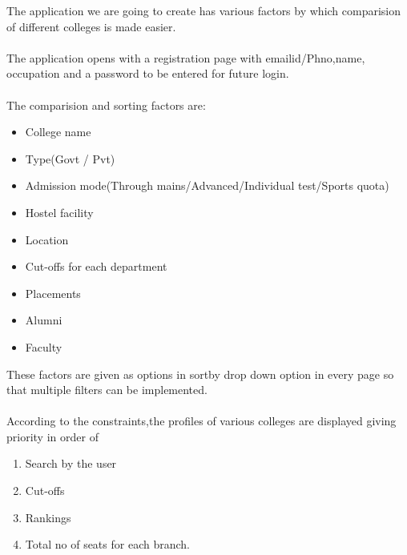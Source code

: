 \documentclass[11pt]{article}
\begin{document}
\begin{large}
The application we are going to create has various factors by which comparision of different colleges is made easier.
\\ \\The application opens with a registration page with emailid/Phno,name, occupation and a password to be entered for future login. 
\\ \\The comparision and sorting factors are:
\begin{itemize}
\item College name
\item Type(Govt / Pvt)
\item Admission mode(Through mains/Advanced/Individual test/Sports quota)
\item Hostel facility
\item Location
\item Cut-offs for each department
\item Placements
\item Alumni
\item Faculty
\end{itemize}
 
These factors are given as options in sortby drop down option in every page so that multiple filters can be implemented.
\\ \\According to the constraints,the profiles of various colleges are displayed giving 
priority in order of
\begin{enumerate}
\item Search by the user
\item Cut-offs
\item Rankings
\item Total no of seats for each branch.

\end{enumerate}


\end{large}
\end{document}
